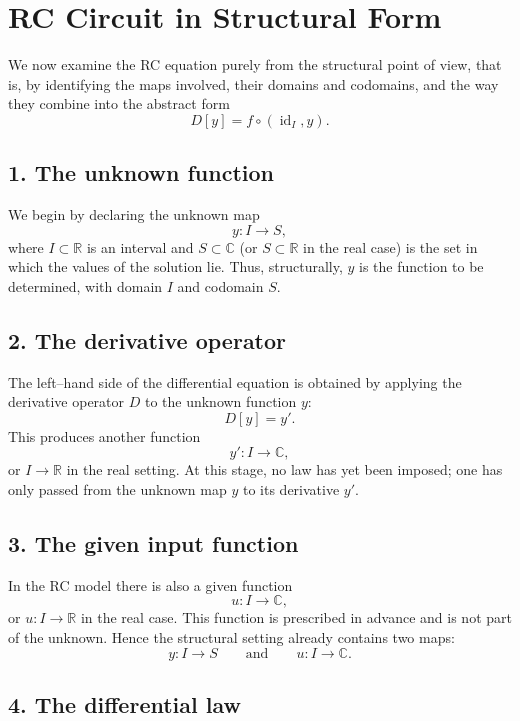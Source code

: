 \documentclass[12pt]{article}
\begin{document}
	\section*{RC Circuit in Structural Form}
	
	We now examine the RC equation purely from the structural point of view, that is, by identifying the maps involved, their domains and codomains, and the way they combine into the abstract form
	$$
	D[y]=f\circ(\operatorname{id}_I,y).
	$$
	
	\subsection*{1. The unknown function}
	
	We begin by declaring the unknown map
	$$
	y:I\to S,
	$$
	where \(I\subset\mathbb{R}\) is an interval and \(S\subset\mathbb{C}\) (or \(S\subset\mathbb{R}\) in the real case) is the set in which the values of the solution lie. Thus, structurally, \(y\) is the function to be determined, with domain \(I\) and codomain \(S\).
	
	\subsection*{2. The derivative operator}
	
	The left--hand side of the differential equation is obtained by applying the derivative operator \(D\) to the unknown function \(y\):
	$$
	D[y]=y'.
	$$
	This produces another function
	$$
	y' : I\to \mathbb{C},
	$$
	or \(I\to\mathbb{R}\) in the real setting. At this stage, no law has yet been imposed; one has only passed from the unknown map \(y\) to its derivative \(y'\).
	
	\subsection*{3. The given input function}
	
	In the RC model there is also a given function
	$$
	u:I\to \mathbb{C},
	$$
	or \(u:I\to\mathbb{R}\) in the real case. This function is prescribed in advance and is not part of the unknown. Hence the structural setting already contains two maps:
	$$
	y:I\to S
	\qquad \text{and} \qquad
	u:I\to\mathbb{C}.
	$$
	
	\subsection*{4. The differential law}
	
\end{document}
